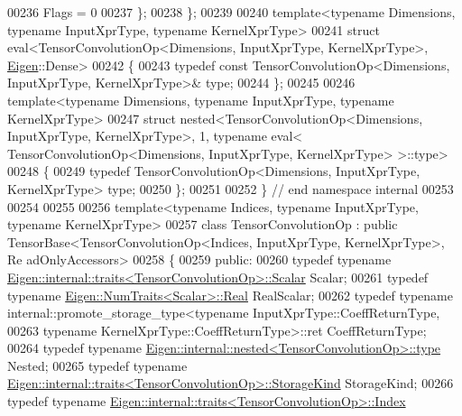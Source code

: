 \begin{DoxyCode}
00236     Flags = 0
00237   \};
00238 \};
00239 
00240 \textcolor{keyword}{template}<\textcolor{keyword}{typename} Dimensions, \textcolor{keyword}{typename} InputXprType, \textcolor{keyword}{typename} KernelXprType>
00241 \textcolor{keyword}{struct }eval<TensorConvolutionOp<Dimensions, InputXprType, KernelXprType>, \hyperlink{namespace_eigen}{Eigen}::Dense>
00242 \{
00243   \textcolor{keyword}{typedef} \textcolor{keyword}{const} TensorConvolutionOp<Dimensions, InputXprType, KernelXprType>& type;
00244 \};
00245 
00246 \textcolor{keyword}{template}<\textcolor{keyword}{typename} Dimensions, \textcolor{keyword}{typename} InputXprType, \textcolor{keyword}{typename} KernelXprType>
00247 \textcolor{keyword}{struct }nested<TensorConvolutionOp<Dimensions, InputXprType, KernelXprType>, 1, typename eval<
      TensorConvolutionOp<Dimensions, InputXprType, KernelXprType> >::type>
00248 \{
00249   \textcolor{keyword}{typedef} TensorConvolutionOp<Dimensions, InputXprType, KernelXprType> type;
00250 \};
00251 
00252 \}  \textcolor{comment}{// end namespace internal}
00253 
00254 
00255 
00256 \textcolor{keyword}{template}<\textcolor{keyword}{typename} Indices, \textcolor{keyword}{typename} InputXprType, \textcolor{keyword}{typename} KernelXprType>
00257 \textcolor{keyword}{class }TensorConvolutionOp : \textcolor{keyword}{public} TensorBase<TensorConvolutionOp<Indices, InputXprType, KernelXprType>, Re
      adOnlyAccessors>
00258 \{
00259   \textcolor{keyword}{public}:
00260   \textcolor{keyword}{typedef} \textcolor{keyword}{typename} \hyperlink{struct_eigen_1_1internal_1_1traits}{Eigen::internal::traits<TensorConvolutionOp>::Scalar}
       Scalar;
00261   \textcolor{keyword}{typedef} \textcolor{keyword}{typename} \hyperlink{group___sparse_core___module}{Eigen::NumTraits<Scalar>::Real} RealScalar;
00262   \textcolor{keyword}{typedef} \textcolor{keyword}{typename} internal::promote\_storage\_type<\textcolor{keyword}{typename} InputXprType::CoeffReturnType,
00263                                                   \textcolor{keyword}{typename} KernelXprType::CoeffReturnType>::ret 
      CoeffReturnType;
00264   \textcolor{keyword}{typedef} \textcolor{keyword}{typename} \hyperlink{class_eigen_1_1internal_1_1_tensor_lazy_evaluator_writable}{Eigen::internal::nested<TensorConvolutionOp>::type}
       Nested;
00265   \textcolor{keyword}{typedef} \textcolor{keyword}{typename} \hyperlink{struct_eigen_1_1internal_1_1traits}{Eigen::internal::traits<TensorConvolutionOp>::StorageKind}
       StorageKind;
00266   \textcolor{keyword}{typedef} \textcolor{keyword}{typename} \hyperlink{struct_eigen_1_1internal_1_1traits}{Eigen::internal::traits<TensorConvolutionOp>::Index}

\end{DoxyCode}
